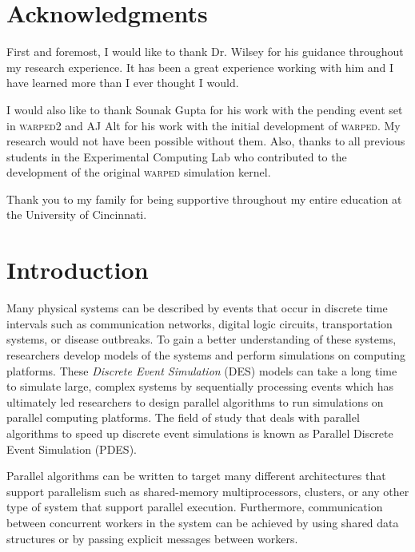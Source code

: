\documentclass[11pt]{book}
\begin{document}
\chapter*{Acknowledgments}

First and foremost, I would like to thank Dr. Wilsey for his guidance throughout my research
experience. It has been a great experience working with him and I have learned more than I
ever thought I would.

I would also like to thank Sounak Gupta for his work with the pending event set in \textsc{warped2}
and AJ Alt for his work with the initial development of \textsc{warped}. My research would not
have been possible without them. Also, thanks to all previous students in the Experimental
Computing Lab who contributed to the development of the original \textsc{warped} simulation
kernel.

Thank you to my family for being supportive throughout my entire education at the University of
Cincinnati.

\tableofcontents    \markright{ }
\listoffigures      \markright{ }
\listoftables       \markright{ }
\listofalgorithms   \markright{ }
\lstlistoflistings  \markright{ }

\clearpage
{} \setcounter{page}{1}

\chapter{Introduction}\label{intro}

Many physical systems can be described by events that occur in discrete time intervals such as
communication networks, digital logic circuits, transportation systems, or disease
outbreaks. To gain a better understanding of these systems, researchers develop models of
the systems and perform simulations on computing platforms. These \emph{Discrete Event
Simulation} (DES) models can take a long time to simulate large, complex systems by sequentially
processing events which has ultimately led researchers to design parallel algorithms to run
simulations on parallel computing platforms. The field of study that deals with parallel algorithms
to speed up discrete event simulations is known as Parallel Discrete Event Simulation (PDES).

Parallel algorithms can be written to target many different architectures that support parallelism
such as shared-memory multiprocessors, clusters, or any other type of system that support
parallel execution. Furthermore, communication between concurrent workers in the system can
be achieved by using shared data structures or by passing explicit messages between workers.
\end{document}
